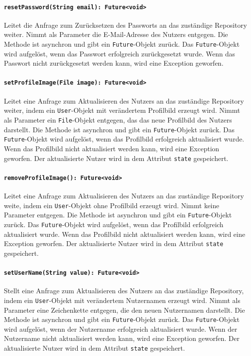 \documentclass{entwurfsheft}
\begin{document}
\paragraph{\texttt{resetPassword(String email): Future<void>}}
Leitet die Anfrage zum Zurücksetzen des Passworts an das zuständige Repository weiter. Nimmt als Parameter die E-Mail-Adresse des Nutzers entgegen. Die Methode ist asynchron und gibt ein \texttt{Future}-Objekt zurück. Das \texttt{Future}-Objekt wird aufgelöst, wenn das Passwort erfolgreich zurückgesetzt wurde. Wenn das Passwort nicht zurückgesetzt werden kann, wird eine Exception geworfen.
\paragraph{\texttt{setProfileImage(File image): Future<void>}}
Leitet eine Anfrage zum Aktualisieren des Nutzers an das zuständige Repository weiter, indem ein \texttt{User}-Objekt mit verändertem Profilbild erzeugt wird. Nimmt als Parameter ein \texttt{File}-Objekt entgegen, das das neue Profilbild des Nutzers darstellt. Die Methode ist asynchron und gibt ein \texttt{Future}-Objekt zurück. Das \texttt{Future}-Objekt wird aufgelöst, wenn das Profilbild erfolgreich aktualisiert wurde. Wenn das Profilbild nicht aktualisiert werden kann, wird eine Exception geworfen. Der aktualisierte Nutzer wird in dem Attribut \texttt{state} gespeichert.
\paragraph{\texttt{removeProfileImage(): Future<void>}}
Leitet eine Anfrage zum Aktualisieren des Nutzers an das zuständige Repository weite, indem ein \texttt{User}-Objekt ohne Profilbild erzeugt wird. Nimmt keine Parameter entgegen. Die Methode ist asynchron und gibt ein \texttt{Future}-Objekt zurück. Das \texttt{Future}-Objekt wird aufgelöst, wenn das Profilbild erfolgreich aktualisiert wurde. Wenn das Profilbild nicht aktualisiert werden kann, wird eine Exception geworfen. Der aktualisierte Nutzer wird in dem Attribut \texttt{state} gespeichert.
\paragraph{\texttt{setUserName(String value): Future<void>}}
Stellt eine Anfrage zum Aktualisieren des Nutzers an das zuständige Repository, indem ein \texttt{User}-Objekt mit verändertem Nutzernamen erzeugt wird. Nimmt als Parameter eine Zeichenkette entgegen, die den neuen Nutzernamen darstellt. Die Methode ist asynchron und gibt ein \texttt{Future}-Objekt zurück. Das \texttt{Future}-Objekt wird aufgelöst, wenn der Nutzername erfolgreich aktualisiert wurde. Wenn der Nutzername nicht aktualisiert werden kann, wird eine Exception geworfen. Der aktualisierte Nutzer wird in dem Attribut \texttt{state} gespeichert.
\end{document}
